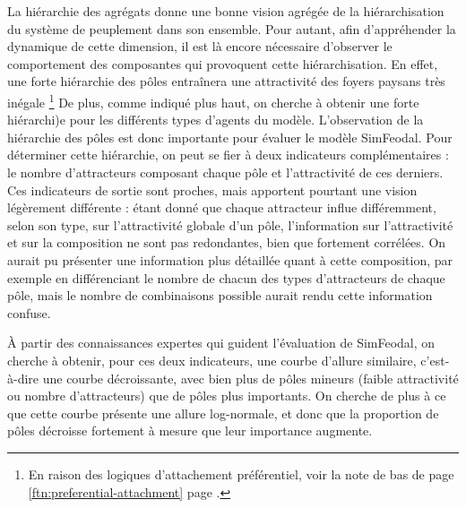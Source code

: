 La hiérarchie des agrégats donne une bonne vision agrégée de la hiérarchisation du système de peuplement dans son ensemble.
Pour autant, afin d'appréhender la dynamique de cette dimension, il est là encore nécessaire d'observer le comportement des composantes qui provoquent cette hiérarchisation.
En effet, une forte hiérarchie des pôles entraînera une attractivité des foyers paysans très inégale \footnote{En raison des logiques d'attachement préférentiel, voir la note de bas de page \ref{ftn:preferential-attachment} page \pageref{ftn:preferential-attachment}.} De plus, comme indiqué plus haut, on cherche à obtenir une forte hiérarchi)e pour les différents types d'agents du modèle.
L'observation de la hiérarchie des pôles est donc importante pour évaluer le modèle SimFeodal.
Pour déterminer cette hiérarchie, on peut se fier à deux indicateurs complémentaires :
le nombre d'attracteurs composant chaque pôle et l'attractivité de ces derniers.
Ces indicateurs de sortie sont proches, mais apportent pourtant une vision légèrement différente :
étant donné que chaque attracteur influe différemment, selon son type, sur l'attractivité globale d'un pôle, l'information sur l'attractivité et sur la composition ne sont pas redondantes, bien que fortement corrélées.
On aurait pu présenter une information plus détaillée quant à cette composition, par exemple en différenciant le nombre de chacun des types d'attracteurs de chaque pôle, mais le nombre de combinaisons possible aurait rendu cette information confuse.

À partir des connaissances expertes qui guident l'évaluation de SimFeodal, on cherche à obtenir, pour ces deux indicateurs, une courbe d'allure similaire, c'est-à-dire une courbe décroissante, avec bien plus de pôles mineurs (faible attractivité ou nombre d'attracteurs) que de pôles plus importants.
On cherche de plus à ce que cette courbe présente une allure log-normale, et donc que la proportion de pôles décroisse fortement à mesure que leur importance augmente.


